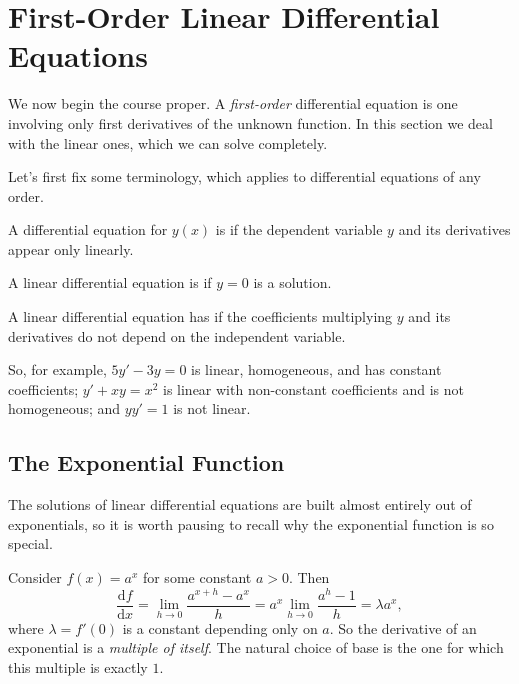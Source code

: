 \section{First-Order Linear Differential Equations}

We now begin the course proper. A \emph{first-order} differential equation is one involving only first derivatives of the unknown function. In this section we deal with the linear ones, which we can solve completely.

Let's first fix some terminology, which applies to differential equations of any order.

\begin{definition}[Linearity]
	A differential equation for $y(x)$ is  if the dependent variable $y$ and its derivatives appear only linearly.
\end{definition}

\begin{definition}
	A linear differential equation is  if $y = 0$ is a solution.
\end{definition}

\begin{definition}
	A linear differential equation has  if the coefficients multiplying $y$ and its derivatives do not depend on the independent variable.
\end{definition}

So, for example, $5y' - 3y = 0$ is linear, homogeneous, and has constant coefficients; $y' + xy = x^2$ is linear with non-constant coefficients and is not homogeneous; and $y y' = 1$ is not linear.

\subsection{The Exponential Function}

The solutions of linear differential equations are built almost entirely out of exponentials, so it is worth pausing to recall why the exponential function is so special.

Consider $f(x) = a^x$ for some constant $a > 0$. Then
$$
\frac{\mathrm{d}f}{\mathrm{d}x} = \lim_{h \to 0} \frac{a^{x + h} - a^x}{h} = a^x \lim_{h \to 0} \frac{a^h - 1}{h} = \lambda a^x,
$$
where $\lambda = f'(0)$ is a constant depending only on $a$. So the derivative of an exponential is a \emph{multiple of itself}. The natural choice of base is the one for which this multiple is exactly $1$.

